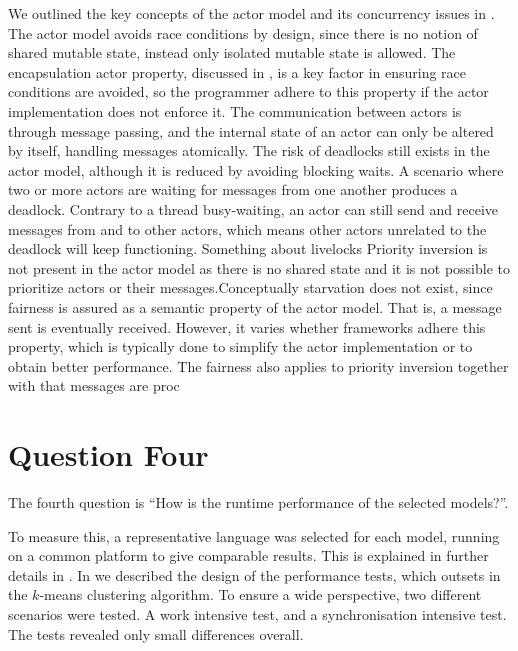 We outlined the key concepts of the actor model and its concurrency issues in . The actor model avoids race conditions by design, since there is no notion of shared mutable state, instead only isolated mutable state is allowed. The encapsulation actor property, discussed in , is a key factor in ensuring race conditions are avoided, so the programmer adhere to this property if the actor implementation does not enforce it. The communication between actors is through message passing, and the internal state of an actor can only be altered by itself, handling messages atomically. The risk of deadlocks still exists in the actor model, although it is reduced by avoiding blocking waits. A scenario where two or more actors are waiting for messages from one another produces a deadlock. Contrary to a thread busy-waiting, an actor can still send and receive messages from and to other actors, which means other actors unrelated to the deadlock will keep functioning. 
Something about livelocks%
Priority inversion is not present in the actor model as there is no shared state and it is not possible to prioritize actors or their messages.Conceptually starvation does not exist, since fairness is assured as a semantic property of the actor model. That is, a message sent is eventually received. However, it varies whether frameworks adhere this property, which is typically done to simplify the actor implementation or to obtain better performance. The fairness also applies to priority inversion together with that messages are proc
\section{Question Four}
The fourth question is ``How is the runtime performance of the selected models?''.

To measure this, a representative language was selected for each model, running on a common platform to give comparable results. This is explained in further details in . In  we described the design of the performance tests, which outsets in the $k$-means clustering algorithm. To ensure a wide perspective, two different scenarios were tested. A work intensive test, and a synchronisation intensive test. The tests revealed only small differences overall. 

